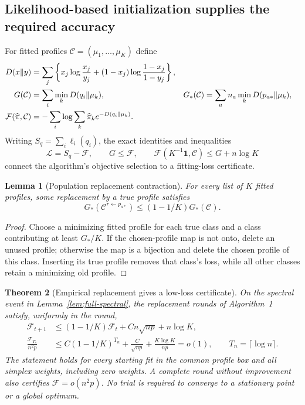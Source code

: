 \documentclass[11pt]{article}
\newtheorem{theorem}{Theorem}[section]
\newtheorem{lemma}[theorem]{Lemma}
\theoremstyle{definition}
\theoremstyle{remark}
\newcommand{\one}{\mathbf 1}
\numberwithin{equation}{section}
\begin{document}
\subsection{Likelihood-based initialization supplies the required accuracy}
For fitted profiles $\mathcal C=(\mu_1,\ldots,\mu_K)$ define
\begin{align}
 D(x\Vert y)&=\sum_j\left\{x_j\log\frac{x_j}{y_j}
                  +(1-x_j)\log\frac{1-x_j}{1-y_j}\right\},
 \label{eq:profile-divergence}\\
 G(\mathcal C)&=\sum_i\min_kD(q_i\Vert\mu_k),
 &G_*(\mathcal C)&=\sum_an_a\min_kD(p_{a*}\Vert\mu_k),\notag\\
 \mathcal F(\widehat\pi,\mathcal C)
    &=-\sum_i\log\sum_k\widehat\pi_k e^{-D(q_i\Vert\mu_k)}.
 \label{eq:soft-loss}
\end{align}
Writing $S_q=\sum_i\ell_i(q_i)$, the exact identities and inequalities
\begin{equation}
 \mathcal L=S_q-\mathcal F,\qquad
 G\le\mathcal F,\qquad
 \mathcal F(K^{-1}\one,\mathcal C)\le G+n\log K
 \label{eq:soft-hard}
\end{equation}
connect the algorithm's objective selection to a fitting-loss certificate.

\begin{lemma}[Population replacement contraction]
\label{lem:population-replacement}
For every list of $K$ fitted profiles, some replacement by a true profile satisfies
\begin{equation}
 G_*(\mathcal C^{r\leftarrow p_{a*}})
 \le(1-1/K)G_*(\mathcal C).
 \label{eq:population-contraction}
\end{equation}
\end{lemma}
\begin{proof}
Choose a minimizing fitted profile for each true class and a class contributing at least $G_*/K$. If the chosen-profile map is not onto, delete an unused profile; otherwise the map is a bijection and delete the chosen profile of this class. Inserting its true profile removes that class's loss, while all other classes retain a minimizing old profile.
\end{proof}

\begin{theorem}[Empirical replacement gives a low-loss certificate]
\label{thm:replacement-contraction}
On the spectral event in Lemma~\ref{lem:full-spectral}, the replacement rounds of Algorithm~1 satisfy, uniformly in the round,
\begin{align}
 \mathcal F_{t+1}
 &\le(1-1/K)\mathcal F_t+Cn\sqrt{np}+n\log K,
 \label{eq:replacement-contraction}\\
 \frac{\mathcal F_{T_n}}{n^2p}
 &\le C(1-1/K)^{T_n}
       +\frac{C}{\sqrt{np}}+\frac{K\log K}{np}=o(1),
 \qquad T_n=\lceil\log n\rceil.
 \label{eq:replacement-weak-loss}
\end{align}
The statement holds for every starting fit in the common profile box and all simplex weights, including zero weights. A complete round without improvement also certifies $\mathcal F=o(n^2p)$. No trial is required to converge to a stationary point or a global optimum.
\end{theorem}
\end{document}
